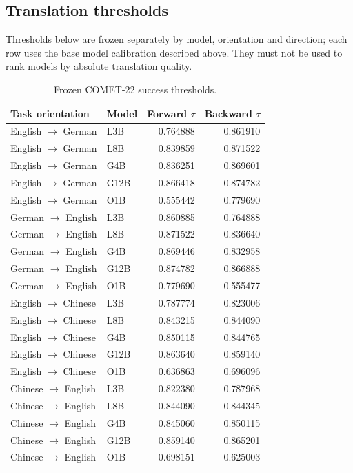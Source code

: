 \subsection{Translation thresholds}
Thresholds below are frozen separately by model, orientation and direction; each row uses the base model calibration described above. They must not be used to rank models by absolute translation quality.
\begin{table}[t]\centering\small
\begin{tabular}{llrr}\toprule Task orientation & Model & Forward $\tau$ & Backward $\tau$ \\\midrule
English $\to$ German & L3B & 0.764888 & 0.861910 \\
English $\to$ German & L8B & 0.839859 & 0.871522 \\
English $\to$ German & G4B & 0.836251 & 0.869601 \\
English $\to$ German & G12B & 0.866418 & 0.874782 \\
English $\to$ German & O1B & 0.555442 & 0.779690 \\
German $\to$ English & L3B & 0.860885 & 0.764888 \\
German $\to$ English & L8B & 0.871522 & 0.836640 \\
German $\to$ English & G4B & 0.869446 & 0.832958 \\
German $\to$ English & G12B & 0.874782 & 0.866888 \\
German $\to$ English & O1B & 0.779690 & 0.555477 \\
English $\to$ Chinese & L3B & 0.787774 & 0.823006 \\
English $\to$ Chinese & L8B & 0.843215 & 0.844090 \\
English $\to$ Chinese & G4B & 0.850115 & 0.844765 \\
English $\to$ Chinese & G12B & 0.863640 & 0.859140 \\
English $\to$ Chinese & O1B & 0.636863 & 0.696096 \\
Chinese $\to$ English & L3B & 0.822380 & 0.787968 \\
Chinese $\to$ English & L8B & 0.844090 & 0.844345 \\
Chinese $\to$ English & G4B & 0.845060 & 0.850115 \\
Chinese $\to$ English & G12B & 0.859140 & 0.865201 \\
Chinese $\to$ English & O1B & 0.698151 & 0.625003 \\
\bottomrule\end{tabular}
\caption{Frozen COMET-22 success thresholds.}\label{tab:translation-thresholds}\end{table}
